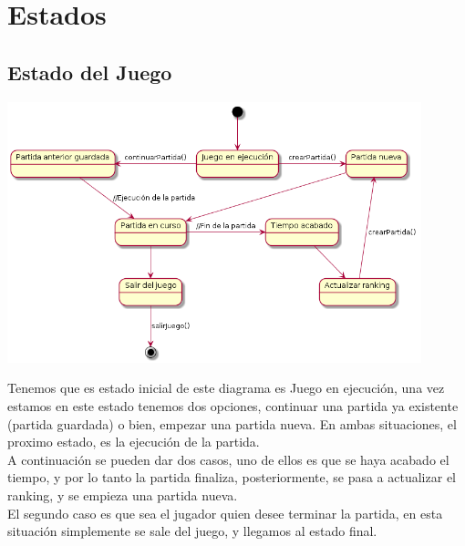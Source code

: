 \section{Estados}\label{sec:uc0}


\subsection{Estado del Juego}\label{sec:uc0}
\begin{center}
  \includegraphics[width=0.9\textwidth]{./imatges/Estados_juego.png}
  \end{center}
  Tenemos que es estado inicial de este diagrama es Juego en ejecución, una vez estamos en este estado tenemos dos opciones, continuar una partida ya existente (partida guardada) o bien, empezar una partida nueva. En ambas situaciones, el proximo estado, es la ejecución de la partida.
  \\A continuación se pueden dar dos casos, uno de ellos es que se haya acabado el tiempo, y por lo tanto la partida finaliza, posteriormente, se pasa a actualizar el ranking, y se empieza una partida nueva.
  \\El segundo caso es que sea el jugador quien desee terminar la partida, en esta situación simplemente se sale del juego, y llegamos al estado final.